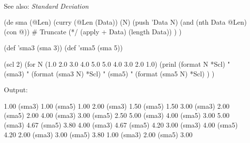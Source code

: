 \\ See also: \emph{Standard Deviation}


\begin{wideverbatim}

(de sma (@Len)
   (curry (@Len (Data)) (N)
      (push 'Data N)
      (and (nth Data @Len) (con @))  # Truncate
      (*/ (apply + Data) (length Data)) ) )


(def 'sma3 (sma 3))
(def 'sma5 (sma 5))

(scl 2)
(for N (1.0 2.0 3.0 4.0 5.0 5.0 4.0 3.0 2.0 1.0)
   (prinl
      (format N *Scl)
      "   (sma3) "
      (format (sma3 N) *Scl)
      "   (sma5) "
      (format (sma5 N) *Scl) ) )

Output:

1.00   (sma3) 1.00   (sma5) 1.00
2.00   (sma3) 1.50   (sma5) 1.50
3.00   (sma3) 2.00   (sma5) 2.00
4.00   (sma3) 3.00   (sma5) 2.50
5.00   (sma3) 4.00   (sma5) 3.00
5.00   (sma3) 4.67   (sma5) 3.80
4.00   (sma3) 4.67   (sma5) 4.20
3.00   (sma3) 4.00   (sma5) 4.20
2.00   (sma3) 3.00   (sma5) 3.80
1.00   (sma3) 2.00   (sma5) 3.00

\end{wideverbatim}


% 
